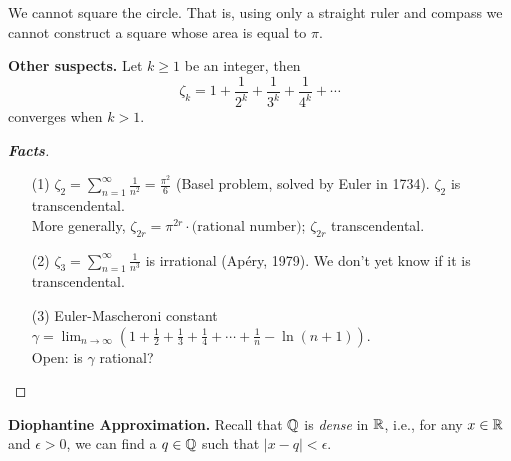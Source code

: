 \vspace*{1em}

\begin{corollary}[ancient]
We cannot square the circle. That is, using only a straight ruler and compass we cannot construct a square whose area is equal to $\pi$.
\end{corollary}

\vspace*{1.5em}

{\bf Other suspects.} Let $k \geq 1$ be an integer, then
\[\zeta_k = 1 + \frac{1}{2^k} + \frac{1}{3^k} + \frac{1}{4^k} + \cdots\]
converges when $k>1$.
\begin{proof}[{\bf Facts}]\renewcommand{\qedsymbol}{}
\begin{itemize}
\item[(1)] $\displaystyle \zeta_2 = \sum_{n=1}^\infty\frac{1}{n^2} = \frac{\pi^2}{6}$ (Basel problem, solved by Euler in 1734). $\zeta_2$ is transcendental.\\[0.5em]
\hspace*{2.8em} More generally, $\zeta_{2r} = \pi^{2r}\cdot\text{(rational number)}$; $\zeta_{2r}$ transcendental.
\end{itemize}
\begin{itemize}[leftmargin=5.5em]
\item[(2)] $\displaystyle \zeta_3 = \sum_{n=1}^\infty\frac{1}{n^3}$ is irrational (Ap\'ery, 1979). We don't yet know if it is transcendental.
\item[(3)] Euler-Mascheroni constant $\displaystyle \gamma = \lim_{n\to \infty}\left(1 + \frac{1}{2} + \frac{1}{3} + \frac{1}{4} + \cdots + \frac{1}{n} - \ln(n+1)\right)$.\\[0.5em]
Open: is $\gamma$ rational?
\end{itemize}
\end{proof}


{\bf\large Diophantine Approximation.} Recall that $\mathbb Q$ is \emph{dense} in $\mathbb R$, i.e., for any $x \in \mathbb R$ and $\epsilon > 0$, we can find a $q \in \mathbb Q$ such that $|x - q| < \epsilon$.

\vspace*{1em}

